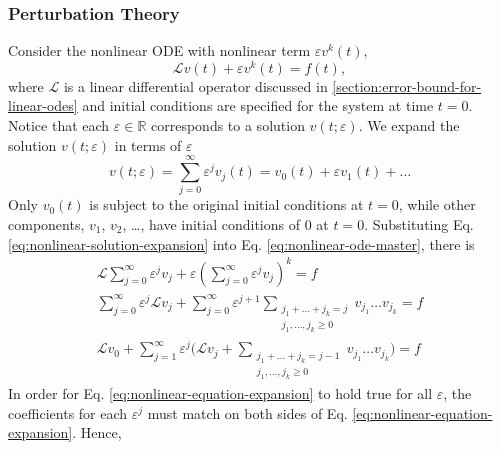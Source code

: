 \documentclass[accepted]{uai2023}
\renewcommand{\L}{\mathcal{L}}
\begin{document}
\subsubsection{Perturbation Theory} \label{section:perturbation-theory}
    Consider the nonlinear ODE with nonlinear term $\varepsilon v^k(t)$,
    {
        \small
        \begin{equation} \label{eq:nonlinear-ode-master}
            \L v(t) + \varepsilon v^k(t) = f(t),
        \end{equation}
    }
    where $\L$ is a linear differential operator discussed in \ref{section:error-bound-for-linear-odes} and initial conditions are specified for the system at time $t=0$. 
    Notice that each $\varepsilon \in \mathbb{R}$ corresponds to a solution $v(t; \varepsilon)$. 
    We expand the solution $v(t; \varepsilon)$ in terms of $\varepsilon$
    {   
        \small
        \begin{equation} \label{eq:nonlinear-solution-expansion}
            v(t; \varepsilon) = \sum_{j=0}^{\infty} \varepsilon^j v_j(t) = v_0(t) + \varepsilon v_1(t) + \dots
        \end{equation}
    }
    Only $v_0(t)$ is subject to the original initial conditions at $t=0$, while other components, $v_1$, $v_2$, \dots, have initial conditions of $0$ at $t=0$.
    Substituting Eq. \ref{eq:nonlinear-solution-expansion} into Eq. \ref{eq:nonlinear-ode-master}, there is
    {
        \small
        \begin{gather}
            \L \sum_{j=0}^{\infty} \varepsilon^j v_j + \varepsilon \left(\sum_{j=0}^{\infty} \varepsilon^j v_j\right)^k = f \\
            \sum_{j=0}^{\infty} \varepsilon^j \L v_j + \sum_{j=0}^{\infty} \varepsilon^{j+1} \sum_{\substack{j_1+\dots+j_k = j\\j_1, \dots, j_k \geq 0}}v_{j_1}\dots v_{j_k} = f \\[-0.5em]
            \L v_0 + \sum_{j=1}^{\infty} \varepsilon^j \Bigg(\L v_j + \sum_{\substack{j_1+\dots+j_k = j - 1\\j_1, \dots, j_k \geq 0}}v_{j_1}\dots v_{j_k}\Bigg)= f \label{eq:nonlinear-equation-expansion} 
        \end{gather}
    }
    In order for Eq. \ref{eq:nonlinear-equation-expansion} to hold true for all $\varepsilon$, the coefficients for each $\varepsilon^j$ must match on both sides of Eq. \ref{eq:nonlinear-equation-expansion}. Hence,
\end{document}
